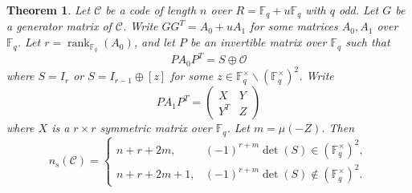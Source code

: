 \documentclass{article}
\newtheorem{theorem}{Theorem}[section]
\theoremstyle{definition}
\theoremstyle{remark}
\begin{document}
\begin{theorem}\label{thm:exact_odd}
    Let $\mathcal{C}$ be a code of length $n$ over $R=\mathbb{F}_q+u\mathbb{F}_q$ with $q$ odd. Let $G$ be a generator matrix of $\mathcal{C}$. Write $GG^T=A_0+uA_1$ for some matrices $A_0, A_1$ over $\mathbb{F}_q$. Let $r=\operatorname{rank}_{\mathbb{F}_q}(A_0)$, and let $P$ be an invertible matrix over $\mathbb{F}_q$ such that
    \[
    PA_0P^T=S\oplus \mathcal{O}
    \]
    where $S=I_r$ or $S=I_{r-1}\oplus [z]$ for some $z\in \mathbb{F}_q^\times\backslash(\mathbb{F}_q^\times)^2$. Write
    \[
    PA_1P^T=\begin{pmatrix}
        X & Y\\Y^T & Z
    \end{pmatrix}
    \]
    where $X$ is a $r\times r$ symmetric matrix over $\mathbb{F}_q$. Let $m=\mu(-Z)$. Then
    \[
    n_s(\mathcal{C})=\begin{cases}
        n+r+2m, & (-1)^{r+m}\det(S)\in (\mathbb{F}_q^\times)^2,\\
        n+r+2m+1, & (-1)^{r+m}\det(S)\notin (\mathbb{F}_q^\times)^2.
    \end{cases}
    \]
\end{theorem}
\end{document}
